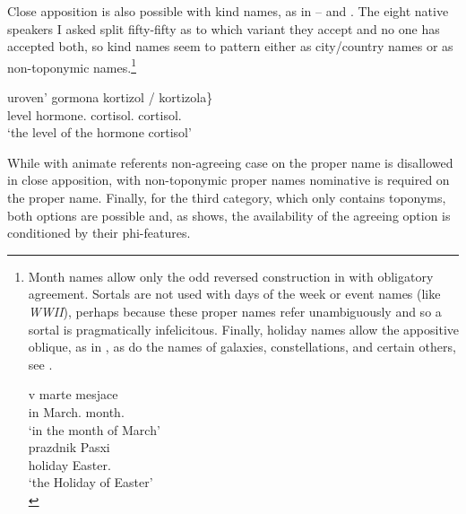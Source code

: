 \documentclass[output=paper,colorlinks,citecolor=brown]{langscibook}
\begin{document}
\noindent Close apposition is also possible with kind names, as in -- and . The eight native speakers I asked split fifty-fifty as to which variant they accept and no one has accepted both, so kind names seem to pattern either as city/country names or as non-toponymic names.\footnote{\label{mat:foot:CloseAppositionAlsoPossible}Month names allow only the odd reversed construction in  with obligatory agreement. Sortals are not used with days of the week or event names (like \textit{WWII}), perhaps because these proper names refer unambiguously and so a sortal is pragmatically infelicitous. Finally, holiday names allow the appositive oblique, as in , as do the names of galaxies, constellations, and certain others, see \citet{Logvinova2018,LogvinovaInPress}.

\ea\label{mat:ex:v-marte-mecjace}
\gll v	marte	mesjace\\
in	March.{\LOC}	month.{\LOC}\\
\glt `in the month of March'\\
\ex\label{mat:ex:prazdnik-pasxi}
\gll 	prazdnik	Pasxi\\
holiday	Easter.{\GEN} \\
\glt `the Holiday of Easter'\\
\z}
 

\ea\label{mat:ex:uroven-gormona} 
\gll uroven'	gormona	\minsp{\{} \minsp{\%} kortizol / \minsp{\%} kortizola\}\\
level	hormone.{\GEN} {}	{} cortisol.{\NOM} {} {} cortisol.{\GEN}\\
\glt `the level of the hormone cortisol'\\
\z


\noindent While with animate referents  non-agreeing case on the proper name is disallowed in close apposition, with non-toponymic proper names  nominative is required on the proper name. Finally, for the third category, which only contains toponyms, both options are possible and, as  shows, the availability of the agreeing option is conditioned by their phi-features.
\end{document}
